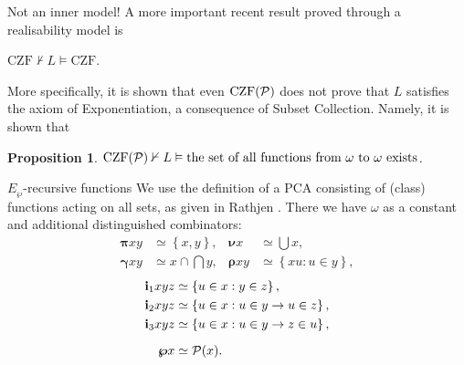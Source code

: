 \documentclass{beamer}
\newtheorem{proposition}{Proposition}
\theoremstyle{definition}
\newcommand{\CZF}{\mathrm{CZF}}
\newcommand{\CZFP}{\CZF\mleft(\mathcal{P}\mright)}
\begin{document}
\begin{frame}{Not an inner model!}
  A more important recent result proved through a realisability model is
  \begin{theorem}
    $\CZF \nvdash L \vDash \CZF$.
  \end{theorem}

  \vspace{0.6em}

  More specifically, it is shown that even $\CZFP$ does not prove that $L$ satisfies the axiom of Exponentiation, a consequence of Subset Collection. Namely, it is shown that
  \begin{proposition}
    $\CZFP \nvdash L \vDash \text{the set of all functions from $\omega$ to $\omega$ exists}$.
  \end{proposition}
\end{frame}

\begin{frame}{$E_\wp$-recursive functions}
  We use the definition of a PCA consisting of (class) functions acting on all sets, as given in Rathjen \cite{rathjen12-weak-strong-existence-property}. There we have $\omega$ as a constant and additional distinguished combinators:
  \begin{align*}
    \bm{\pi}xy    & \simeq \left\{x, y\right\}, & \bm{\nu}x   & \simeq \bigcup x,                   \\
    \bm{\gamma}xy & \simeq x \cap \bigcap y,    & \bm{\rho}xy & \simeq \left\{xu : u \in y\right\},
  \end{align*}
  \vspace{-2em}
  \begin{align*}
    \mathbf{i}_1xyz & \simeq \left\{u \in x : y \in z\right\},                     \\
    \mathbf{i}_2xyz & \simeq \left\{u \in x : u \in y \rightarrow u \in z\right\}, \\
    \mathbf{i}_3xyz & \simeq \left\{u \in x : u \in y \rightarrow z \in u\right\}, \\[0.6em]
    \bm{\wp}x       & \simeq \mathcal{P}\mleft(x\mright).
  \end{align*}
\end{frame}
\end{document}
